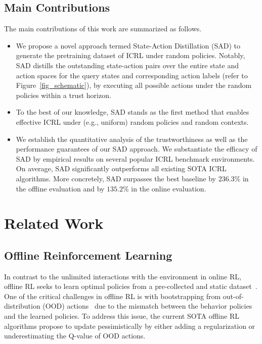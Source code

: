 \documentclass[10pt]{article}
\begin{document}
\subsection{Main Contributions}
The main contributions of this work are summarized as follows.
\begin{itemize}
    \item We propose a novel approach termed State-Action Distillation (SAD) to generate the pretraining dataset of ICRL under random policies. Notably, SAD distills the outstanding state-action pairs over the entire state and action spaces for the query states and corresponding action labels (refer to Figure~\ref{fig_schematic}), by executing all possible actions under the random policies within a trust horizon.
    \item To the best of our knowledge, SAD stands as the first method that enables effective ICRL under (e.g., uniform) random policies and random contexts.
    \item We establish the quantitative analysis of the trustworthiness as well as the performance guarantees of our SAD approach. We substantiate the efficacy of SAD by empirical results on several popular ICRL benchmark environments.
    On average, SAD significantly outperforms all existing SOTA ICRL algorithms. More concretely, SAD surpasses the best baseline by $236.3\%$ in the offline evaluation and by $135.2\%$ in the online evaluation.
\end{itemize}
\section{Related Work}
\label{appendix_related_work}
\subsection{Offline Reinforcement Learning}
In contrast to the unlimited interactions with the environment in online RL, offline RL seeks to learn optimal policies from a pre-collected and static dataset~\citep{fujimoto2019benchmarking, levine2020offline, kumar2020conservative, kostrikov2021offline, chen2024domain}. One of the critical challenges in offline RL is with bootstrapping from out-of-distribution (OOD) actions~\citep{levine2020offline, kumar2020conservative, xu2022policy, liu2024beyond} due to the mismatch between the behavior policies and the learned policies. To address this issue, the current SOTA offline RL algorithms propose to update pessimistically by either adding a regularization or underestimating the Q-value of OOD actions.
\end{document}
